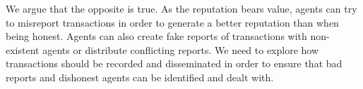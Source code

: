 We argue that the opposite is true. As the reputation bears value, agents can try to misreport 
transactions in order to generate a better reputation than when being honest. Agents can also create
fake reports of transactions with non-existent agents or distribute conflicting reports. We need to
explore how transactions should be recorded and disseminated in order to ensure that bad 
reports and dishonest agents can be identified and dealt with.




